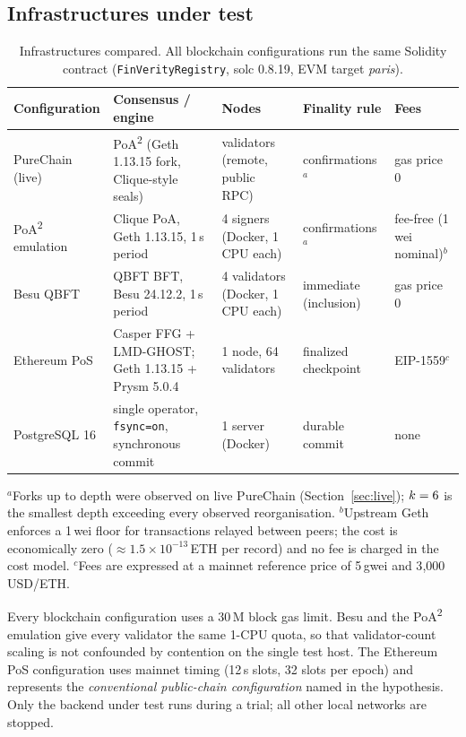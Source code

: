 \documentclass[10pt]{article}
\newcommand{\poa}{PoA\textsuperscript{2}}
\begin{document}
\subsection{Infrastructures under test}\label{sec:infra}
\begin{table}[H]
\centering\scriptsize
\caption{Infrastructures compared. All blockchain configurations run the same Solidity contract
(\texttt{FinVerityRegistry}, solc 0.8.19, EVM target \emph{paris}).}\label{tab:infra}
\begin{tabular}{p{2.6cm}p{3.5cm}p{3.1cm}p{2.4cm}p{3.3cm}}
\toprule
Configuration & Consensus / engine & Nodes & Finality rule & Fees \\
\midrule
PureChain (live) & \poa{} (Geth 1.13.15 fork, Clique-style seals) & \LiveValidators{} validators (remote, public RPC) & \FinalityDepth{} confirmations$^{a}$ & gas price 0 \\
\poa{} emulation & Clique PoA, Geth 1.13.15, 1\,s period & 4 signers (Docker, 1 CPU each) & \FinalityDepth{} confirmations$^{a}$ & fee-free (1\,wei nominal)$^{b}$ \\
Besu QBFT & QBFT BFT, Besu 24.12.2, 1\,s period & 4 validators (Docker, 1 CPU each) & immediate (inclusion) & gas price 0 \\
Ethereum PoS & Casper FFG + LMD-GHOST; Geth 1.13.15 + Prysm 5.0.4 & 1 node, 64 validators & finalized checkpoint & EIP-1559$^{c}$ \\
PostgreSQL 16 & single operator, \texttt{fsync=on}, synchronous commit & 1 server (Docker) & durable commit & none \\
\bottomrule
\end{tabular}
\par\smallskip\footnotesize
$^{a}$Forks up to depth \LiveMaxReorg{} were observed on live PureChain (Section~\ref{sec:live});
$k=6$ is the smallest depth exceeding every observed reorganisation. $^{b}$Upstream Geth enforces a 1\,wei floor for transactions relayed between
peers; the cost is economically zero ($\approx1.5\times10^{-13}$\,ETH per record) and no fee is charged in the cost
model. $^{c}$Fees are expressed at a mainnet reference price of 5\,gwei and 3{,}000\,USD/ETH.
\end{table}

Every blockchain configuration uses a 30\,M block gas limit. Besu and the \poa{} emulation give every validator the
same 1-CPU quota, so that validator-count scaling is not confounded by contention on the single test host. The
Ethereum PoS configuration uses mainnet timing (12\,s slots, 32 slots per epoch) and represents the
\emph{conventional public-chain configuration} named in the hypothesis. Only the backend under test runs during a
trial; all other local networks are stopped.
\end{document}
